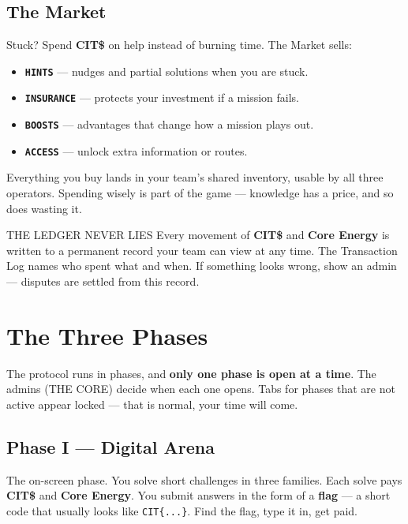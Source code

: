 \documentclass[11pt]{article}
\newcommand{\chip}[2]{{\setlength{\fboxsep}{2pt}\colorbox{#1!18}{\color{#1}\footnotesize\textbf{\texttt{#2}}}}}
\newcommand{\cit}{\textbf{\color{warn}CIT\$}}
\newcommand{\nrg}{\textbf{\color{info}Core Energy}}
\begin{document}
\subsection{The Market}
Stuck? Spend \cit{} on help instead of burning time. The Market sells:
\begin{itemize}
  \item \chip{warn}{HINTS} — nudges and partial solutions when you are stuck.
  \item \chip{info}{INSURANCE} — protects your investment if a mission fails.
  \item \chip{item}{BOOSTS} — advantages that change how a mission plays out.
  \item \chip{term}{ACCESS} — unlock extra information or routes.
\end{itemize}
Everything you buy lands in your team's shared inventory, usable by all three
operators. Spending wisely is part of the game — knowledge has a price, and so
does wasting it.

\begin{infobox}{THE LEDGER NEVER LIES}
Every movement of \cit{} and \nrg{} is written to a permanent record your
team can view at any time. The Transaction Log names who spent what and when.
If something looks wrong, show an admin — disputes are settled from this record.
\end{infobox}

\section{The Three Phases}
The protocol runs in phases, and \textbf{only one phase is open at a time}.
The admins (THE CORE) decide when each one opens. Tabs for phases that are not
active appear locked — that is normal, your time will come.

\subsection{Phase I — Digital Arena}
The on-screen phase. You solve short challenges in three families. Each solve
pays \cit{} and \nrg{}. You submit answers in the form of a
\textbf{flag} — a short code that usually looks like \texttt{CIT\{...\}}.
Find the flag, type it in, get paid.
\end{document}
